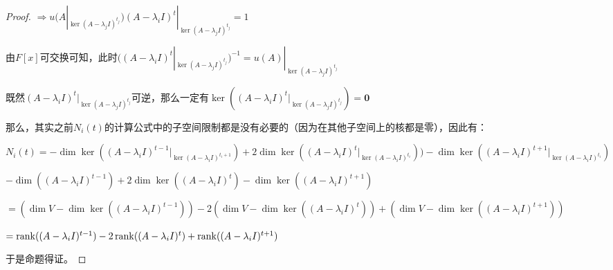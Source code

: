 \documentclass[12pt, a4paper, oneside, UTF8]{ctexbook}
\begin{document}
\begin{proof}
				$\Rightarrow u(A|_{\ker (A-\lambda_j I)^{t_j}})(A-\lambda_i I)^{t}|_{\ker (A-\lambda_j I)^{t_j}}=1$

				由$F[x]$可交换可知，此时$((A-\lambda_i I)^{t}|_{\ker (A-\lambda_j I)^{t_j}})^{-1}=u(A)|_{\ker (A-\lambda_j I)^{t_j}}$

				既然$(A-\lambda_i I)^{t}|_{\ker (A-\lambda_j I)^{t_j}}$可逆，那么一定有$\ker((A-\lambda_i I)^t|_{\ker (A-\lambda_j I)^{t_j}})=\mathbf{0}$

				那么，其实之前$N_i(t)$的计算公式中的子空间限制都是没有必要的（因为在其他子空间上的核都是零），因此有：

				$N_i(t)=-\dim \ker((A-\lambda_i I)^{t-1}|_{\ker(A-\lambda_i I)^{t_i+1}})+2\dim \ker((A-\lambda_i I)^{t}|_{\ker(A-\lambda_i I)^{t_i}}))-\dim \ker((A-\lambda_i I)^{t+1}|_{\ker(A-\lambda_i I)^{t_i}})$

				$-\dim((A-\lambda_i I)^{t-1})+2\dim\ker((A-\lambda_i I)^{t})-\dim\ker((A-\lambda_i I)^{t+1})$

				$=(\dim V-\dim\ker((A-\lambda_i I)^{t-1}))-2(\dim V-\dim\ker ((A-\lambda_i I)^{t}))+(\dim V-\dim\ker ((A-\lambda_i I)^{t+1}))$

				$=\operatorname{rank}((A-\lambda_i I)^{t-1})-2\operatorname{rank}((A-\lambda_i I)^{t})+\operatorname{rank}((A-\lambda_i I)^{t+1})$

				于是命题得证。
			\end{proof}
\ifx\allfiles\undefined
\end{document}
